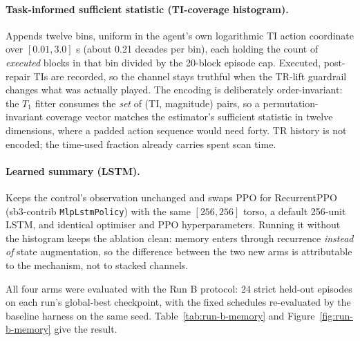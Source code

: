 \paragraph{Task-informed sufficient statistic (TI-coverage histogram).}
Appends twelve bins, uniform in the agent's own logarithmic TI action
coordinate over $[0.01, 3.0]$ s (about 0.21 decades per bin), each holding
the count of \emph{executed} blocks in that bin divided by the 20-block
episode cap. Executed, post-repair TIs are recorded, so the channel stays
truthful when the TR-lift guardrail changes what was actually played. The
encoding is deliberately order-invariant: the $T_1$ fitter consumes the
\emph{set} of (TI, magnitude) pairs, so a permutation-invariant coverage
vector matches the estimator's sufficient statistic in twelve dimensions,
where a padded action sequence would need forty. TR history is not encoded;
the time-used fraction already carries spent scan time.

\paragraph{Learned summary (LSTM).} Keeps the control's observation
unchanged and swaps PPO for RecurrentPPO (sb3-contrib
\texttt{MlpLstmPolicy}) with the same $[256,256]$ torso, a default 256-unit
LSTM, and identical optimiser and PPO hyperparameters. Running it without
the histogram keeps the ablation clean: memory enters through recurrence
\emph{instead of} state augmentation, so the difference between the two new
arms is attributable to the mechanism, not to stacked channels.

All four arms were evaluated with the Run B protocol: 24 strict held-out
episodes on each run's global-best checkpoint, with the fixed
schedules re-evaluated by the baseline harness on the same seed.
Table~\ref{tab:run-b-memory} and Figure~\ref{fig:run-b-memory} give the
result.

